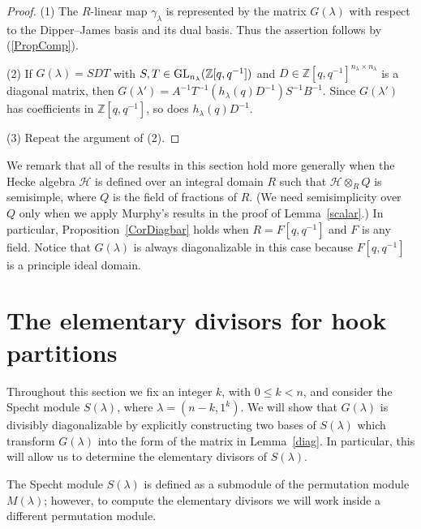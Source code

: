 \documentclass[twoside]{amsart}
\numberwithin{equation}{section}
\theoremstyle{remark}
\def\GL{\mathop{\rm GL}\nolimits}
\def\Z{{\mathbb Z}}
\def\H{\mathscr H}
\begin{document}
\begin{proof}
(1) The $R$-linear map $\gamma_\lambda$ is represented by the matrix $G(\lambda)$ with respect to the Dipper--James basis and its dual basis. Thus
the assertion follows by (\ref{PropComp}).

(2) If $G(\lambda) = SDT$ with $S,T\in\GL_{n_\lambda}(\Z[q,q^{-1}])$ and $D\in\Z[q,q^{-1}]^{n_\lambda\times n_\lambda}$ is a diagonal matrix, then 
$G(\lambda') = A^{-1}T^{-1}(h_\lambda(q) D^{-1})S^{-1}B^{-1}$. Since $G(\lambda')$ has coefficients in $\Z[q,q^{-1}]$, so does $h_\lambda(q) D^{-1}$.

(3) Repeat the argument of (2). 
\end{proof}

We remark that all of the results in this section hold more generally
when the Hecke algebra $\H$ is defined over an integral domain $R$
such that $\H\otimes_R Q$ is semisimple, where $Q$ is the field of
fractions of $R$. (We need semisimplicity over~$Q$ only when we apply
Murphy's results in the proof of Lemma~\ref{scalar}.) In particular,
Proposition~\ref{CorDiagbar} holds when $R=F[q,q^{-1}]$ and $F$ is any
field. Notice that $G(\lambda)$ is always diagonalizable in this case
because $F[q,q^{-1}]$ is a principle ideal domain.

\section{The elementary divisors for hook partitions}

Throughout this section we fix an integer $k$, with $0\le k<n$, and
consider the Specht module $S(\lambda)$, where $\lambda=(n-k,1^k)$. We
will show that $G(\lambda)$ is divisibly diagonalizable by explicitly
constructing two bases of $S(\lambda)$ which transform $G(\lambda)$
into the form of the matrix in Lemma~\ref{diag}. In particular, this
will allow us to determine the elementary divisors of $S(\lambda)$.

The Specht module $S(\lambda)$ is defined as a submodule of the
permutation module $M(\lambda)$; however, to compute the elementary
divisors we will work inside a different permutation module.
\end{document}
